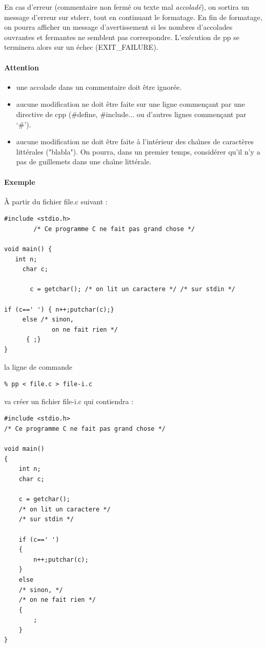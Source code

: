 En cas d'erreur (commentaire non ferm\'e ou texte mal
\textit{accolad\'e}), on sortira un message d'erreur sur stderr, tout
en continuant le formatage. En fin de formatage, on pourra afficher un
message d'avertissement si les nombres d'accolades ouvrantes et
fermantes ne semblent pas correspondre. L'ex\'ecution de pp se
terminera alors sur un \'echec (EXIT\_FAILURE).

\paragraph{Attention}
\begin{itemize}
\item une accolade dans un commentaire doit \^etre ignor\'ee.
\item aucune modification ne doit \^etre faite sur une ligne commen\c{c}ant
  par une directive de cpp (\#define, \#include... ou d'autres lignes
  commen\c{c}ant par `\#').
\item aucune modification ne doit \^etre faite \`a l'int\'erieur des cha\^\i{}nes
  de caract\`eres litt\'erales ("blabla"). On pourra, dans un premier
  temps, consid\'erer qu'il n'y a pas de guillemets dans une cha\^\i{}ne
  litt\'erale.
\end{itemize}

\paragraph{Exemple}
\`A partir du fichier file.c suivant :
\begin{verbatim}
#include <stdio.h>
        /* Ce programme C ne fait pas grand chose */

void main() {
   int n;
     char c;
        
       c = getchar(); /* on lit un caractere */ /* sur stdin */

if (c==' ') { n++;putchar(c);}
     else /* sinon,
             on ne fait rien */
      { ;}
}
\end{verbatim}
la ligne de commande
\begin{verbatim}
% pp < file.c > file-i.c
\end{verbatim}
va cr\'eer un fichier file-i.c qui contiendra :
\begin{verbatim}
#include <stdio.h>
/* Ce programme C ne fait pas grand chose */

void main()
{
    int n;
    char c;

    c = getchar();
    /* on lit un caractere */
    /* sur stdin */

    if (c==' ')
    {
        n++;putchar(c);
    }
    else
    /* sinon, */
    /* on ne fait rien */
    {
        ;
    }
}
\end{verbatim}
  
